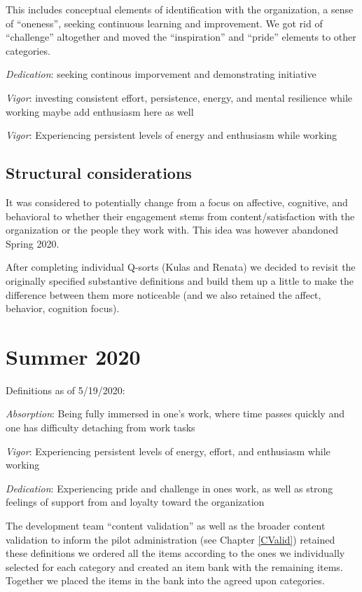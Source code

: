 \documentclass[
]{book}
\begin{document}
This includes conceptual elements of identification with the organization, a sense of ``oneness'', seeking continuous learning and improvement. We got rid of ``challenge'' altogether and moved the ``inspiration'' and ``pride'' elements to other categories.

\emph{Dedication}: seeking continous imporvement and demonstrating initiative

\emph{Vigor}: investing consistent effort, persistence, energy, and mental resilience while working \citep{schaufeli_measurement_2002} maybe add enthusiasm here as well

\emph{Vigor}: Experiencing persistent levels of energy and enthusiasm while working

\hypertarget{structural-considerations}{%
\subsection{Structural considerations}\label{structural-considerations}}

It was considered to potentially change from a focus on affective, cognitive, and behavioral to whether their engagement stems from content/satisfaction with the organization or the people they work with. This idea was however abandoned Spring 2020.

After completing individual Q-sorts (Kulas and Renata) we decided to revisit the originally specified substantive definitions and build them up a little to make the difference between them more noticeable (and we also retained the affect, behavior, cognition focus).

\hypertarget{summer-2020}{%
\section{Summer 2020}\label{summer-2020}}

Definitions as of 5/19/2020:

\emph{Absorption}: Being fully immersed in one's work, where time passes quickly and one has difficulty detaching from work tasks

\emph{Vigor}: Experiencing persistent levels of energy, effort, and enthusiasm while working

\emph{Dedication}: Experiencing pride and challenge in ones work, as well as strong feelings of support from and loyalty toward the organization

The development team ``content validation'' as well as the broader content validation to inform the pilot administration (see Chapter \ref{CValid}) retained these definitions we ordered all the items according to the ones we individually selected for each category and created an item bank with the remaining items. Together we placed the items in the bank into the agreed upon categories.
\end{document}
